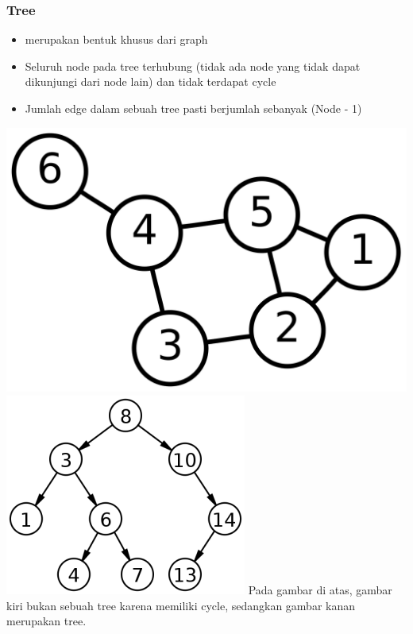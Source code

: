 \begin{frame}
\frametitle{Tree}
\begin{itemize}
  \item {} merupakan bentuk khusus dari graph
  \item Seluruh node pada tree terhubung (tidak ada node yang tidak dapat dikunjungi dari node lain) dan tidak terdapat \alert{cycle}
  \item Jumlah edge dalam sebuah tree pasti berjumlah sebanyak (Node - 1)
\end{itemize}

\includegraphics[width=4 cm]{asset/not-tree.png}
\hspace{\fill}
\includegraphics[width=4 cm]{asset/tree.png}
\newline\newline
Pada gambar di atas, gambar kiri bukan sebuah tree karena memiliki cycle, sedangkan gambar kanan merupakan tree. 
\end{frame}

